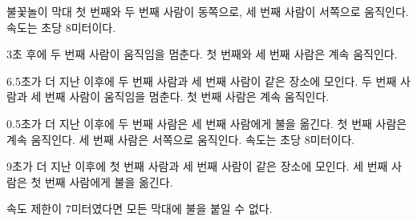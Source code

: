 \begin{problem}{불꽃놀이 막대}
	첫 번째와 두 번째 사람이 동쪽으로, 세 번째 사람이 서쪽으로 움직인다. 속도는 초당 8미터이다.
	
	3초 후에 두 번째 사람이 움직임을 멈춘다. 첫 번째와 세 번째 사람은 계속 움직인다.
	
	6.5초가 더 지난 이후에 두 번째 사람과 세 번째 사람이 같은 장소에 모인다. 두 번째 사람과 세 번째 사람이 움직임을 멈춘다. 첫 번째 사람은 계속 움직인다.
	
	0.5초가 더 지난 이후에 두 번째 사람은 세 번째 사람에게 불을 옮긴다. 첫 번째 사람은 계속 움직인다. 세 번째 사람은 서쪽으로 움직인다. 속도는 초당 8미터이다.
	
	9초가 더 지난 이후에 첫 번째 사람과 세 번째 사람이 같은 장소에 모인다. 세 번째 사람은 첫 번째 사람에게 불을 옮긴다.
		
	속도 제한이 7미터였다면 모든 막대에 불을 붙일 수 없다.
	
	\begin{example}
	\end{example}
	
	
\end{problem}

